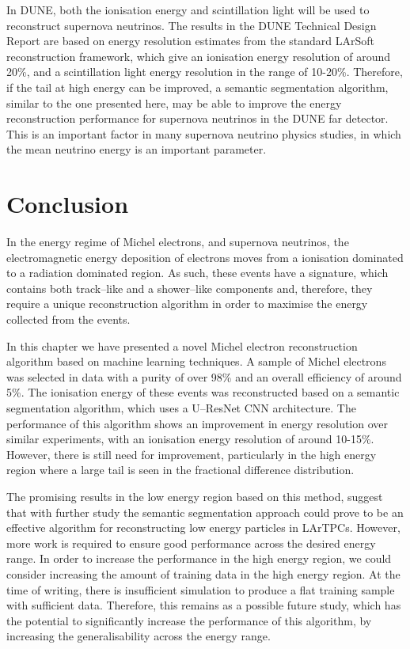 In DUNE, both the ionisation energy and scintillation light will be used to
reconstruct supernova neutrinos. The results in the DUNE Technical Design
Report are based on energy resolution estimates from the standard
LArSoft reconstruction framework, which give an ionisation energy resolution of
around 20\%, and a scintillation light energy resolution in the range of
10-20\%\cite{Abi:2020evt}. Therefore, if the tail at high energy can be 
improved, a semantic segmentation algorithm, similar to the one presented 
here, may be able to improve the energy reconstruction performance for 
supernova neutrinos in the DUNE far detector. This is an important factor in
many supernova neutrino physics studies, in which the mean neutrino energy is an
important parameter\cite{Abi:2020evt}.

\section{Conclusion} \label{ME_EU}

In the energy regime of Michel electrons, and supernova neutrinos, the
electromagnetic energy deposition of electrons moves from a ionisation dominated
to a radiation dominated region. As such, these events have a signature, which
contains both track--like and a shower--like components and, therefore, they 
require a unique reconstruction algorithm in order to maximise the energy 
collected from the events. 

In this chapter we have presented a novel Michel electron reconstruction
algorithm based on machine learning techniques. A sample of Michel electrons was
selected in \protodune{} data with a purity of over 98\% and an overall
efficiency of around 5\%. The ionisation energy of these events was
reconstructed based on a semantic segmentation algorithm, which uses a U--ResNet
CNN architecture. The performance of this algorithm shows an improvement in
energy resolution over similar experiments, with an ionisation energy resolution
of around 10-15\%. However, there is still need for improvement, particularly 
in the high energy region where a large tail is seen in the fractional 
difference distribution. 

The promising results in the low energy region based on this method, suggest
that with further study the semantic segmentation approach could prove to be an
effective algorithm for reconstructing low energy particles in LArTPCs. However,
more work is required to ensure good performance across the desired energy
range. In order to increase the performance in the high energy region, we could
consider increasing the amount of training data in the high energy region. At
the time of writing, there is insufficient \protodune{} simulation to produce 
a flat training sample with sufficient data. Therefore, this remains as a 
possible future study, which has the potential to significantly increase the
performance of this algorithm, by increasing the generalisability across the
energy range.
